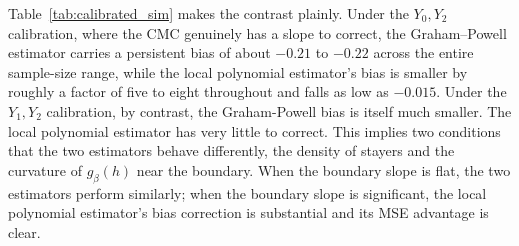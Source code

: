 \documentclass{article}
\begin{document}
Table~\ref{tab:calibrated_sim} makes the contrast plainly. Under the $Y_0,Y_2$ calibration, where the CMC genuinely has a slope to correct, the Graham--Powell estimator carries a persistent bias of about $-0.21$ to $-0.22$ across the entire sample-size range, while the local polynomial estimator's bias is smaller by roughly a factor of five to eight throughout and falls as low as $-0.015$. Under the $Y_1,Y_2$ calibration, by contrast, the Graham-Powell bias is itself much smaller. The local polynomial estimator has very little to correct. This implies two conditions that the two estimators behave differently, the density of stayers and the curvature of $g_\beta(h)$ near the boundary. When the boundary slope is flat, the two estimators perform similarly; when the boundary slope is significant, the local polynomial estimator's bias correction is substantial and its MSE advantage is clear.

\newpage






\end{document}
